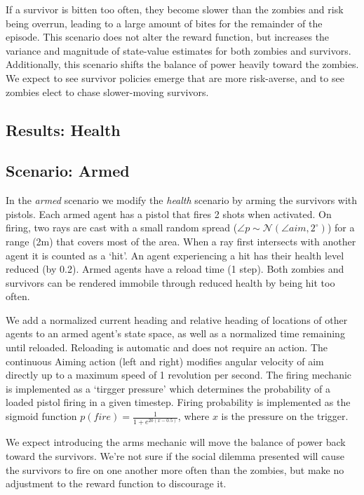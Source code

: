 \documentclass[11pt,a4paper]{article}
\begin{document}
If a survivor is bitten too often, they become slower than the zombies and risk being overrun, leading to a large amount of bites for the remainder of the episode.
This scenario does not alter the reward function, but increases the variance and magnitude of state-value estimates for both zombies and survivors.
Additionally, this scenario shifts the balance of power heavily toward the zombies.
We expect to see survivor policies emerge that are more risk-averse, and to see zombies elect to chase slower-moving survivors.

\subsection{Results: Health}

\subsection{Scenario: Armed}
\label{sec:arms}

In the \emph{armed} scenario we modify the \emph{health} scenario by arming the survivors with pistols.
Each armed agent has a pistol that fires 2 shots when activated.
On firing, two rays are cast with a small random spread ($\angle p \sim \mathcal{N}(\angle aim, 2^\circ)$) for a range (2m) that covers most of the area.
When a ray first intersects with another agent it is counted as a `hit'.
An agent experiencing a hit has their health level reduced (by 0.2).
Armed agents have a reload time (1 step).
Both zombies and survivors can be rendered immobile through reduced health by being hit too often.

We add a normalized current heading and relative heading of locations of other agents to an armed agent's state space, as well as a normalized time remaining until reloaded.
Reloading is automatic and does not require an action.
The continuous Aiming action (left and right) modifies angular velocity of aim directly up to a maximum speed of 1 revolution per second.
The firing mechanic is implemented as a `tirgger pressure' which determines the probability of a loaded pistol firing in a given timestep.
Firing probability is implemented as the sigmoid function $p(fire) = \frac{1}{1+e^{20(x-0.5)}}$, where $x$ is the pressure on the trigger.

We expect introducing the arms mechanic will move the balance of power back toward the survivors.
We're not sure if the social dilemma presented will cause the survivors to fire on one another more often than the zombies,
but make no adjustment to the reward function to discourage it.
\end{document}
